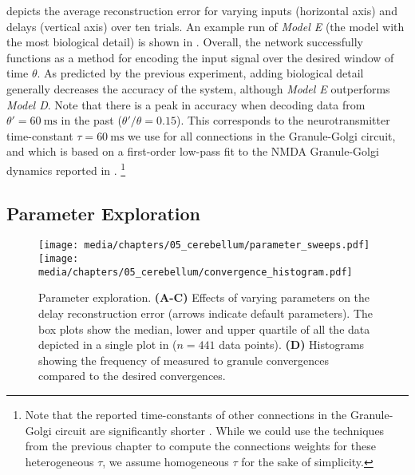  depicts the average reconstruction error for varying inputs (horizontal axis) and delays (vertical axis) over ten trials.
An example run of \emph{Model E} (the model with the most biological detail) is shown in .
Overall, the network successfully functions as a method for encoding the input signal over the desired window of time $\theta$.
As predicted by the previous experiment, adding biological detail generally decreases the accuracy of the system, although \emph{Model E} outperforms \emph{Model D}.
Note that there is a peak in accuracy when decoding data from $\theta' = \SI{60}{\milli\second}$ in the past ($\theta'/\theta=0.15$).
This corresponds to the neurotransmitter time-constant $\tau = \SI{60}{\milli\second}$ we use for all connections in the Granule-Golgi circuit, and which is based on a first-order low-pass fit to the NMDA Granule-Golgi dynamics reported in \citet{dieudonne1998submillisecond}.%
\footnote{Note that the reported time-constants of other connections in the Granule-Golgi circuit are significantly shorter \citep{kanichay2008synaptic}.
While we could use the techniques from the previous chapter to compute the connections weights for these heterogeneous $\tau$, we assume homogeneous $\tau$ for the sake of simplicity.}

\clearpage

\subsection{Parameter Exploration}
\label{sec:cerebellum_vary_parameters}

\begin{figure}[t]%
	\centering
	\texttt{[image: media/chapters/05\_cerebellum/parameter\_sweeps.pdf]}%
	\texttt{[image: media/chapters/05\_cerebellum/convergence\_histogram.pdf]}%
	{\label{fig:cerebellum_param_sweeps_a}}%
	{\label{fig:cerebellum_param_sweeps_b}}%
	{\label{fig:cerebellum_param_sweeps_c}}%
	{\label{fig:cerebellum_param_sweeps_d}}%
	\caption[Cerebellum model parameter exploration]{Parameter exploration. \textbf{(A-C)} Effects of varying parameters on the delay reconstruction error (arrows indicate default parameters). The box plots show the median, lower and upper quartile of all the data depicted in a single plot in  ($n = 441$ data points). \textbf{(D)} Histograms showing the frequency of measured \PCN to granule convergences compared to the desired convergences.}
	\label{fig:cerebellum_param_sweeps}
\end{figure}

